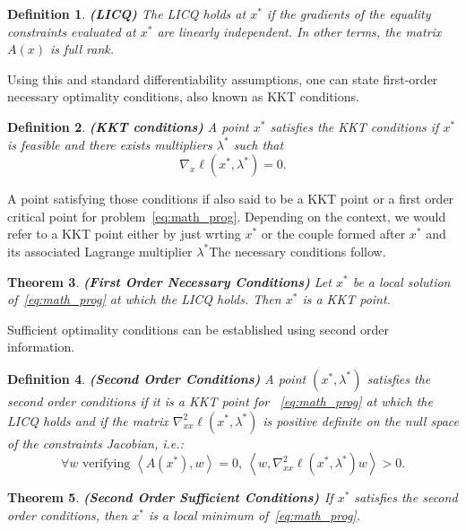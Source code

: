 \documentclass[10pt]{article}
\newtheorem{theorem}{Theorem}[]
\newtheorem{definition}[theorem]{Definition}
\numberwithin{equation}{section}
\newcommand{\scal}[2]{\left\langle {#1} , {#2} \right\rangle} %
\begin{document}
	\begin{definition}\label{def:licq}
		\textbf{(LICQ)}
		The LICQ holds at $x^*$ if the gradients of the equality constraints evaluated at $x^*$ are linearly independent. In other terms, the matrix $A(x)$ is full rank.
	\end{definition}
	
	Using this and standard differentiability assumptions, one can state first-order necessary optimality conditions, also known as KKT conditions. 
	
	\begin{definition}\label{def:kkt_point}
		\textbf{(KKT conditions)}
		A point $x^*$ satisfies the KKT conditions if $x^* $ is feasible and there exists multipliers \(\lambda^*\) such that \[\nabla_x \ell (x^*,\lambda^*)=0.\]
	\end{definition}
	
	
	A point satisfying those conditions if also said to be a KKT point or a first order critical point for problem~\eqref{eq:math_prog}. Depending on the context, we would refer to a KKT point either by just wrting $x^*$ or the couple formed after $x^*$ and its associated Lagrange multiplier $\lambda^*$The necessary conditions follow.
	
	\begin{theorem}\label{theo:fonc}
		\textbf{(First Order Necessary Conditions)\cite[][Theorem 12.1]{nocedalwright:2006}}
		Let $x^*$ be a local solution of~\eqref{eq:math_prog} at which the LICQ holds. Then $x^*$ is a KKT point.
	\end{theorem}
	
	Sufficient optimality conditions can be established using second order information.
	
	\begin{definition}\label{def:soc}
		\textbf{(Second Order Conditions)}
		A point $(x^*,\lambda^*)$ satisfies the second order conditions if it is a KKT point for ~\eqref{eq:math_prog} at which the LICQ holds and if the matrix $\nabla_{xx}^2\ell(x^*,\lambda^*)$ is positive definite on the null space of the constraints Jacobian, i.e.:
		\[\forall w \text{ verifying } \scal{A(x^*)}{w}=0,\ \scal{w}{\nabla_{xx}^2\ell(x^*,\lambda^*)w} > 0.\]
	\end{definition}
	
	\begin{theorem} \textbf{(Second Order Sufficient Conditions) \cite[][Theorem 12.5]{nocedalwright:2006}}
		If $x^*$ satisfies the second order conditions, then $x^*$ is a local minimum of~\eqref{eq:math_prog}.
	\end{theorem}
	
\end{document}
